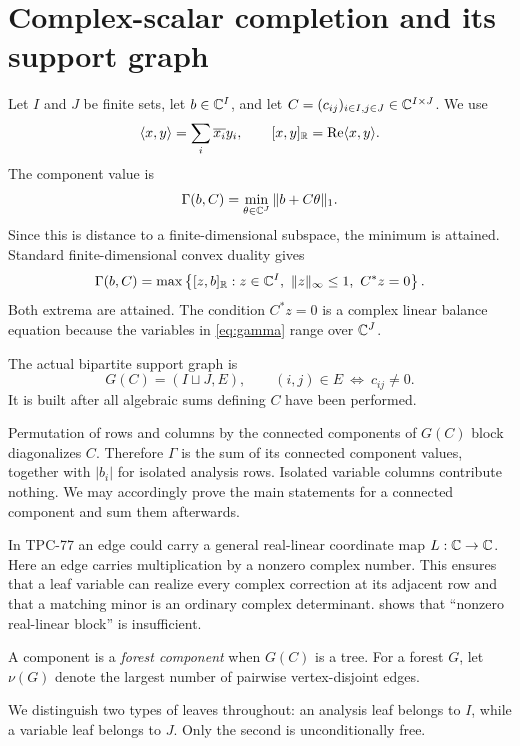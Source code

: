 \section{Complex-scalar completion and its support graph}
\label{sec:setup}

Let \(I\) and \(J\) be finite sets, let \(b\in\mathbb C^I\), and let
\(C=(c_{ij})_{i\in I,j\in J}\in\mathbb C^{I\times J}\).  We use
\[
 \langle x,y\rangle=\sum_i\overline{x_i}y_i,
 \qquad
 [x,y]_{\mathbb R}=\operatorname{Re}\langle x,y\rangle.
\]
The component value is
\begin{equation}\label{eq:gamma}
 \Gamma(b,C)
 =
 \min_{\theta\in\mathbb C^J}\|b+C\theta\|_1.
\end{equation}
Since this is distance to a finite-dimensional subspace, the minimum is
attained.  Standard finite-dimensional convex duality
\cite{Rockafellar1970} gives
\begin{equation}\label{eq:dual}
 \Gamma(b,C)
 =
 \max\left\{
 [z,b]_{\mathbb R}:
 z\in\mathbb C^I,\ \|z\|_\infty\le1,\ C^*z=0
 \right\}.
\end{equation}
Both extrema are attained.  The condition \(C^*z=0\) is a complex
linear balance equation because the variables in \eqref{eq:gamma}
range over \(\mathbb C^J\).

\begin{definition}\label{def:actual-graph}
The actual bipartite support graph is
\[
 G(C)=(I\sqcup J,E),
 \qquad
 (i,j)\in E\ \Longleftrightarrow\ c_{ij}\ne0.
\]
It is built after all algebraic sums defining \(C\) have been
performed.
\end{definition}

Permutation of rows and columns by the connected components of \(G(C)\)
block diagonalizes \(C\).  Therefore \(\Gamma\) is the sum of its
connected component values, together with \(|b_i|\) for isolated
analysis rows.  Isolated variable columns contribute nothing.  We may
accordingly prove the main statements for a connected component and
sum them afterwards.

\begin{remark}\label{rem:scalar}
In TPC-77 an edge could carry a general real-linear coordinate map
\(L:\mathbb C\to\mathbb C\).  Here an edge carries multiplication by a nonzero
complex number.  This ensures that a leaf variable can realize every
complex correction at its adjacent row and that a matching minor is an
ordinary complex determinant.   shows that
``nonzero real-linear block'' is insufficient.
\end{remark}

\begin{definition}
A component is a \emph{forest component} when \(G(C)\) is a tree.
For a forest \(G\), let \(\nu(G)\) denote the largest number of
pairwise vertex-disjoint edges.
\end{definition}

We distinguish two types of leaves throughout:
an analysis leaf belongs to \(I\), while a variable leaf belongs to
\(J\).  Only the second is unconditionally free.

